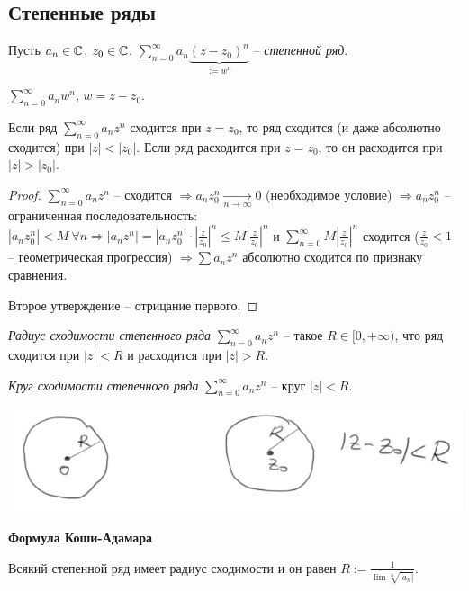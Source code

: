\subsection{Степенные ряды}

\begin{definition}
    Пусть $a_n\in \mathbb{C}$, $z_0\in \mathbb{C}$. $\sum\limits_{n=0}^\infty a_n\underbrace{(z-z_0)^n}_{:=w^n}$ – \textit{степенной ряд}.

    $\sum\limits_{n=0}^\infty a_nw^n$, $w = z-z_0$.
\end{definition}

\begin{theorem}
    Если ряд $\sum\limits_{n=0}^\infty a_nz^n$ сходится при $z=z_0$, то ряд сходится (и даже абсолютно сходится) при $|z|<|z_0|$. Если ряд расходится при $z=z_0$, то он расходится при $|z|>|z_0|$.
\end{theorem}

\begin{proof}
    $\sum\limits_{n=0}^\infty a_nz^n$ – сходится $\Rightarrow a_nz_0^n\underset{n\rightarrow \infty}{\rightarrow} 0$ (необходимое условие) $\Rightarrow a_nz_0^n$ – ограниченная последовательность: $|a_nz^n_0|< M\ \forall n\Rightarrow |a_nz^n|=|a_nz_0^n|\cdot |\frac{z}{z_0}|^n\leq M |\frac{z}{z_0}|^n $ и $\sum\limits_{n=0}^\infty M|\frac{z}{z_0}|^n$ сходится ($\frac{z}{z_0}<1$ – геометрическая прогрессия) $\Rightarrow\sum a_nz^n$ абсолютно сходится по признаку сравнения.

    Второе утверждение – отрицание первого.
\end{proof}

\begin{definition}
    \textit{Радиус сходимости степенного ряда} $\sum\limits_{n=0}^\infty a_nz^n$ – такое $R\in [0, +\infty)$, что ряд сходится при $|z|<R$ и расходится при $|z|>R$.
    
    \textit{Круг сходимости степенного ряда} $\sum\limits_{n=0}^\infty a_nz^n$ – круг  $|z|<R$.

    \includegraphics[width=0.5\linewidth]{images/10-05-1.png}
\end{definition}

\begin{theorem}
    \textbf{Формула Коши-Адамара}

    Всякий степенной ряд имеет радиус сходимости и он равен $R:=\frac{1}{\overline{\lim}\sqrt[n]{|a_n|}}$.
\end{theorem}

